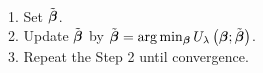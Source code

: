 \medskip

\\
$~~~$ 1. Set $\tbbeta$.\\
$~~~$ 2. Update $\tbbeta$ by $\tbbeta = \arg\min_{\sbbeta}U_\lambda\left(\bbeta;\tbbeta\right)$.\\
$~~~$ 3. Repeat the Step 2 until convergence.





